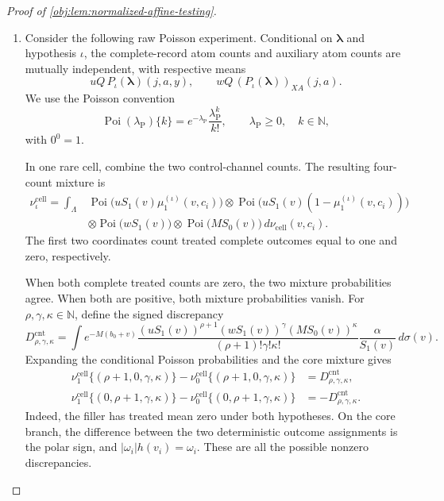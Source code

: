 \documentclass[11pt]{article}
\begin{document}
\begin{proof}[Proof of \cref{obj:lem:normalized-affine-testing}]
\begin{enumerate}
\item
Consider the following raw Poisson experiment. Conditional on
\(\boldsymbol\lambda\) and hypothesis \(\iota\), the complete-record atom counts and auxiliary atom counts are mutually independent, with respective means
\[
uQ\,P_\iota(\boldsymbol\lambda)(j,a,y),
\qquad
wQ\,(P_\iota(\boldsymbol\lambda))_{XA}(j,a).
\]
We use the Poisson convention
\[
\operatorname{Poi}(\lambda_{\mathrm P})\{k\}
=e^{-\lambda_{\mathrm P}}\frac{\lambda_{\mathrm P}^k}{k!},
\qquad \lambda_{\mathrm P}\ge0,\quad k\in\mathbb N,
\]
with \(0^0=1\).

In one rare cell, combine the two control-channel counts. The resulting four-count mixture is
\[
\begin{aligned}
\nu_\iota^{\mathrm{cell}}
=\int_{\Lambda}
&\operatorname{Poi}\bigl(uS_1(v)\mu_1^{(\iota)}(v,c_i)\bigr)
\otimes
\operatorname{Poi}\bigl(uS_1(v)(1-\mu_1^{(\iota)}(v,c_i))\bigr)\\
&\otimes\operatorname{Poi}\bigl(wS_1(v)\bigr)
\otimes\operatorname{Poi}\bigl(MS_0(v)\bigr)
\,d\nu_{\mathrm{cell}}(v,c_i).
\end{aligned}
\]
The first two coordinates count treated complete outcomes equal to one and zero, respectively.

When both complete treated counts are zero, the two mixture probabilities agree. When both are positive, both mixture probabilities vanish. For
\(\rho,\gamma,\kappa\in\mathbb N\), define the signed discrepancy
\[
D_{\rho,\gamma,\kappa}^{\mathrm{cnt}}
=
\int e^{-M(b_0+v)}
\frac{(uS_1(v))^{\rho+1}(wS_1(v))^\gamma(MS_0(v))^\kappa}
     {(\rho+1)!\gamma!\kappa!}
\frac{\alpha}{S_1(v)}\,d\sigma(v).
\]
Expanding the conditional Poisson probabilities and the core mixture gives
\[
\begin{aligned}
\nu_1^{\mathrm{cell}}\{(\rho+1,0,\gamma,\kappa)\}
-\nu_0^{\mathrm{cell}}\{(\rho+1,0,\gamma,\kappa)\}
&=D_{\rho,\gamma,\kappa}^{\mathrm{cnt}},\\
\nu_1^{\mathrm{cell}}\{(0,\rho+1,\gamma,\kappa)\}
-\nu_0^{\mathrm{cell}}\{(0,\rho+1,\gamma,\kappa)\}
&=-D_{\rho,\gamma,\kappa}^{\mathrm{cnt}}.
\end{aligned}
\]
Indeed, the filler has treated mean zero under both hypotheses. On the core branch, the difference between the two deterministic outcome assignments is the polar sign, and
\(|\omega_i|h(v_i)=\omega_i\). These are all the possible nonzero discrepancies.


\end{enumerate}
\end{proof}
\end{document}
